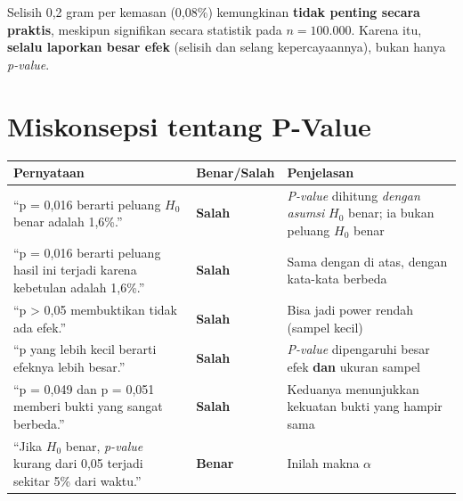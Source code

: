 \documentclass[
  indonesian,
  letterpaper,
]{book}
\newcounter{none} %
\begin{document}
Selisih 0,2 gram per kemasan (0,08\%) kemungkinan \textbf{tidak penting
secara praktis}, meskipun signifikan secara statistik pada
\(n = 100.000\). Karena itu, \textbf{selalu laporkan besar efek}
(selisih dan selang kepercayaannya), bukan hanya \emph{p-value}.

\section{Miskonsepsi tentang P-Value}\label{miskonsepsi-tentang-p-value}

{\def\LTcaptype{none} %
\begin{longtable}[]{@{}
  >{\raggedright\arraybackslash}p{}
  >{\raggedright\arraybackslash}p{}
  >{\raggedright\arraybackslash}p{}@{}}
\toprule\noalign{}
\begin{minipage}[b]{\linewidth}\raggedright
Pernyataan
\end{minipage} & \begin{minipage}[b]{\linewidth}\raggedright
Benar/Salah
\end{minipage} & \begin{minipage}[b]{\linewidth}\raggedright
Penjelasan
\end{minipage} \\
\midrule\noalign{}
\endhead
\bottomrule\noalign{}
\endlastfoot
``p = 0,016 berarti peluang \(H_0\) benar adalah 1,6\%.'' &
\textbf{Salah} & \emph{P-value} dihitung \emph{dengan asumsi} \(H_0\)
benar; ia bukan peluang \(H_0\) benar \\
``p = 0,016 berarti peluang hasil ini terjadi karena kebetulan adalah
1,6\%.'' & \textbf{Salah} & Sama dengan di atas, dengan kata-kata
berbeda \\
``p \textgreater{} 0,05 membuktikan tidak ada efek.'' & \textbf{Salah} &
Bisa jadi power rendah (sampel kecil) \\
``p yang lebih kecil berarti efeknya lebih besar.'' & \textbf{Salah} &
\emph{P-value} dipengaruhi besar efek \textbf{dan} ukuran sampel \\
``p = 0,049 dan p = 0,051 memberi bukti yang sangat berbeda.'' &
\textbf{Salah} & Keduanya menunjukkan kekuatan bukti yang hampir sama \\
``Jika \(H_0\) benar, \emph{p-value} kurang dari 0,05 terjadi sekitar
5\% dari waktu.'' & \textbf{Benar} & Inilah makna \(\alpha\) \\
\end{longtable}
}
\end{document}
